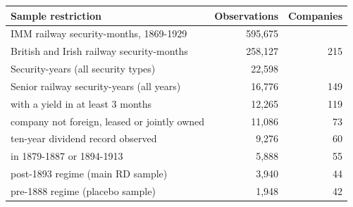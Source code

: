 \begin{tabular}{lrr}
\toprule
Sample restriction & Observations & Companies \\
\midrule
IMM railway security-months, 1869-1929 & 595,675 &  \\
British and Irish railway security-months & 258,127 & 215 \\
Security-years (all security types) & 22,598 &  \\
Senior railway security-years (all years) & 16,776 & 149 \\
\quad with a yield in at least 3 months & 12,265 & 119 \\
\quad company not foreign, leased or jointly owned & 11,086 & 73 \\
\quad ten-year dividend record observed & 9,276 & 60 \\
\quad in 1879-1887 or 1894-1913 & 5,888 & 55 \\
\quad post-1893 regime (main RD sample) & 3,940 & 44 \\
\quad pre-1888 regime (placebo sample) & 1,948 & 42 \\
\bottomrule
\end{tabular}
